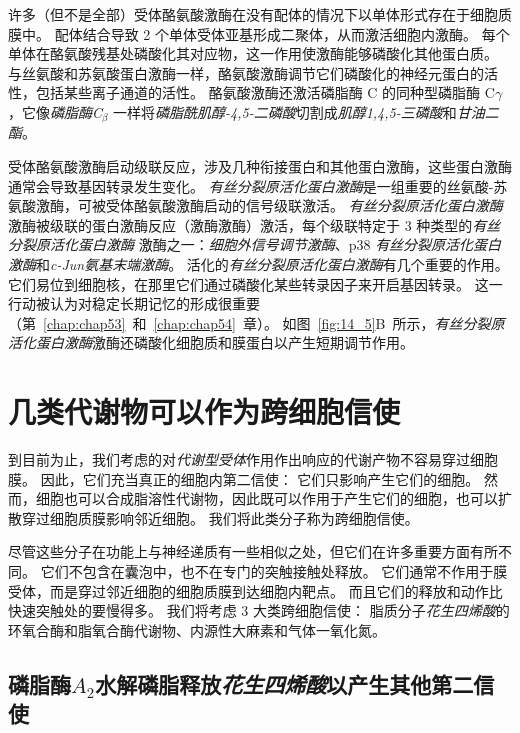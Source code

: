 许多（但不是全部）受体酪氨酸激酶在没有配体的情况下以单体形式存在于细胞质膜中。
配体结合导致 2 个单体受体亚基形成二聚体，从而激活细胞内激酶。
每个单体在酪氨酸残基处磷酸化其对应物，这一作用使激酶能够磷酸化其他蛋白质。
与丝氨酸和苏氨酸蛋白激酶一样，酪氨酸激酶调节它们磷酸化的神经元蛋白的活性，包括某些离子通道的活性。
酪氨酸激酶还激活磷脂酶 C 的同种型磷脂酶 C$\gamma$，它像\textit{磷脂酶C}$_\beta$ 一样将\textit{磷脂酰肌醇-4,5-二磷酸}切割成\textit{肌醇1,4,5-三磷酸}和\textit{甘油二酯}。


受体酪氨酸激酶启动级联反应，涉及几种衔接蛋白和其他蛋白激酶，这些蛋白激酶通常会导致基因转录发生变化。
\textit{有丝分裂原活化蛋白激酶}是一组重要的丝氨酸-苏氨酸激酶，可被受体酪氨酸激酶启动的信号级联激活。
\textit{有丝分裂原活化蛋白激酶}激酶被级联的蛋白激酶反应（激酶激酶）激活，每个级联特定于 3 种类型的\textit{有丝分裂原活化蛋白激酶} 激酶之一：\textit{细胞外信号调节激酶}、p38 \textit{有丝分裂原活化蛋白激酶}和\textit{c-Jun氨基末端激酶}。
活化的\textit{有丝分裂原活化蛋白激酶}有几个重要的作用。
它们易位到细胞核，在那里它们通过磷酸化某些转录因子来开启基因转录。
这一行动被认为对稳定长期记忆的形成很重要（第~\ref{chap:chap53}~和~\ref{chap:chap54}~章）。
如图~\ref{fig:14_5}B~所示，\textit{有丝分裂原活化蛋白激酶}激酶还磷酸化细胞质和膜蛋白以产生短期调节作用。



\section{几类代谢物可以作为跨细胞信使}

到目前为止，我们考虑的对\textit{代谢型受体}作用作出响应的代谢产物不容易穿过细胞膜。
因此，它们充当真正的细胞内第二信使：
它们只影响产生它们的细胞。
然而，细胞也可以合成脂溶性代谢物，因此既可以作用于产生它们的细胞，也可以扩散穿过细胞质膜影响邻近细胞。
我们将此类分子称为跨细胞信使。


尽管这些分子在功能上与神经递质有一些相似之处，但它们在许多重要方面有所不同。
它们不包含在囊泡中，也不在专门的突触接触处释放。
它们通常不作用于膜受体，而是穿过邻近细胞的细胞质膜到达细胞内靶点。
而且它们的释放和动作比快速突触处的要慢得多。
我们将考虑 3 大类跨细胞信使：
脂质分子\textit{花生四烯酸}的环氧合酶和脂氧合酶代谢物、内源性大麻素和气体一氧化氮。



\subsection{磷脂酶$A_2$水解磷脂释放\textit{花生四烯酸}以产生其他第二信使}

